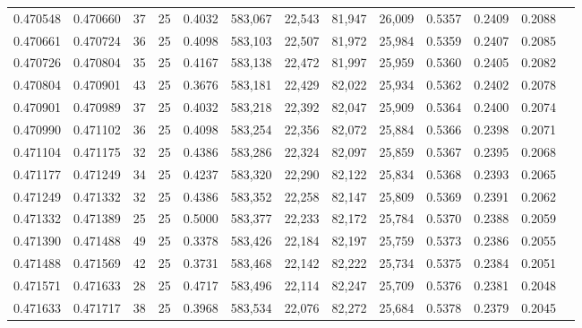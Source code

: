 \begin{tabular}{rrrrrrrrrrrrr}
0.470548 & 0.470660 &    37 &  25 &                                     0.4032 & 583,067 &  22,543 &  81,947 &  26,009 & 0.5357 & 0.2409 & 0.2088 \\
0.470661 & 0.470724 &    36 &  25 &                                     0.4098 & 583,103 &  22,507 &  81,972 &  25,984 & 0.5359 & 0.2407 & 0.2085 \\
0.470726 & 0.470804 &    35 &  25 &                                     0.4167 & 583,138 &  22,472 &  81,997 &  25,959 & 0.5360 & 0.2405 & 0.2082 \\
0.470804 & 0.470901 &    43 &  25 &                                     0.3676 & 583,181 &  22,429 &  82,022 &  25,934 & 0.5362 & 0.2402 & 0.2078 \\
0.470901 & 0.470989 &    37 &  25 &                                     0.4032 & 583,218 &  22,392 &  82,047 &  25,909 & 0.5364 & 0.2400 & 0.2074 \\
0.470990 & 0.471102 &    36 &  25 &                                     0.4098 & 583,254 &  22,356 &  82,072 &  25,884 & 0.5366 & 0.2398 & 0.2071 \\
0.471104 & 0.471175 &    32 &  25 &                                     0.4386 & 583,286 &  22,324 &  82,097 &  25,859 & 0.5367 & 0.2395 & 0.2068 \\
0.471177 & 0.471249 &    34 &  25 &                                     0.4237 & 583,320 &  22,290 &  82,122 &  25,834 & 0.5368 & 0.2393 & 0.2065 \\
0.471249 & 0.471332 &    32 &  25 &                                     0.4386 & 583,352 &  22,258 &  82,147 &  25,809 & 0.5369 & 0.2391 & 0.2062 \\
0.471332 & 0.471389 &    25 &  25 &                                     0.5000 & 583,377 &  22,233 &  82,172 &  25,784 & 0.5370 & 0.2388 & 0.2059 \\
0.471390 & 0.471488 &    49 &  25 &                                     0.3378 & 583,426 &  22,184 &  82,197 &  25,759 & 0.5373 & 0.2386 & 0.2055 \\
0.471488 & 0.471569 &    42 &  25 &                                     0.3731 & 583,468 &  22,142 &  82,222 &  25,734 & 0.5375 & 0.2384 & 0.2051 \\
0.471571 & 0.471633 &    28 &  25 &                                     0.4717 & 583,496 &  22,114 &  82,247 &  25,709 & 0.5376 & 0.2381 & 0.2048 \\
0.471633 & 0.471717 &    38 &  25 &                                     0.3968 & 583,534 &  22,076 &  82,272 &  25,684 & 0.5378 & 0.2379 & 0.2045 \\

\end{tabular}
